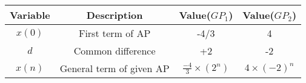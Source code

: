 \begin{tabular}{|c|c|c|c|}
      \hline
      Variable & Description & Value($GP_1$) & Value($GP_2$)\\\hline
      $x(0)$ & First term of AP & -4/3 & 4\\\hline
      $d$ & Common difference & +2 & -2\\\hline
      $x(n)$ & General term of given AP & $\frac{-4}{3}\times(2^n)$ &      $4\times(-2)^n$\\\hline
\end{tabular}

